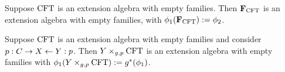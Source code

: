 \begin{lem}
Suppose $\mathrm{CFT}$ is an extension algebra with empty families. Then
$\mathbf{F}_{\mathrm{CFT}}$ is an extension algebra with empty families, with
$\phi_1(\mathbf{F}_{\mathrm{CFT}}):=\phi_2$. 
\end{lem}

\begin{lem}
Suppose $\mathrm{CFT}$ is an extension algebra with empty families and consider
$p:C\rightarrow X\leftarrow Y:p$. Then
$\cobesys{Y}{\stesys}{g}{p}$ is an extension algebra with empty families
with $\phi_1(\cobesys{Y}{\stesys}{g}{p}):=g^\ast(\phi_1)$.
\end{lem}
